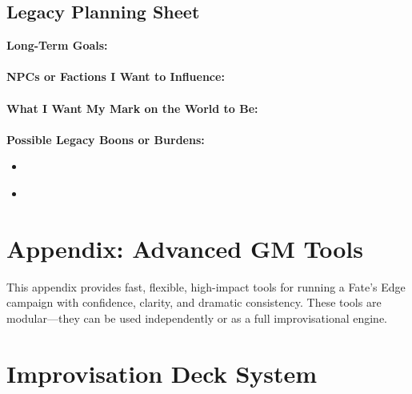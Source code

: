 \documentclass[11pt]{article}
\begin{document}
\subsection{Legacy Planning Sheet}

\begin{tcolorbox}[
  title=\textbf{Legacy Planning Sheet},
  colback=gray!10,
  colframe=black,
  fonttitle=\bfseries,
  sharp corners,
  enhanced
,breakable]

\textbf{Long-Term Goals:} \\
\underline{\phantom{XXXXXXXXXXXXXXXXXXXX}} \\

\textbf{NPCs or Factions I Want to Influence:} \\
\underline{\phantom{XXXXXXXXXXXXXXXXXXXX}} \\

\textbf{What I Want My Mark on the World to Be:} \\
\underline{\phantom{XXXXXXXXXXXXXXXXXXXXXX}} \\

\textbf{Possible Legacy Boons or Burdens:}
\begin{itemize}
  \item \underline{\phantom{Boon/Burden}}
  \item \underline{\phantom{Boon/Burden}}
\end{itemize}

\end{tcolorbox}

\section*{Appendix: Advanced GM Tools}

This appendix provides fast, flexible, high-impact tools for running a Fate's Edge campaign 
with confidence, clarity, and dramatic consistency. These tools are modular---they can be used 
independently or as a full improvisational engine.


\section{Improvisation Deck System}
\label{appendix:improv-decks}
\end{document}
